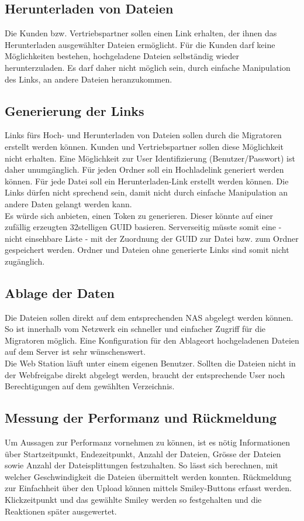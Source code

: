 \subsection{Herunterladen von Dateien}
Die Kunden bzw. Vertriebspartner sollen einen Link erhalten, der ihnen das Herunterladen ausgewählter Dateien ermöglicht.
Für die Kunden darf keine Möglichkeiten bestehen, hochgeladene Dateien selbständig wieder herunterzuladen. 
Es darf daher nicht möglich sein, durch einfache Manipulation des Links, an andere Dateien heranzukommen.

\subsection{Generierung der Links}\label{subsec:Links}
Links fürs Hoch-  und Herunterladen von Dateien sollen durch die Migratoren erstellt werden können. Kunden und Vertriebspartner sollen diese Möglichkeit nicht erhalten. 
Eine Möglichkeit zur User Identifizierung (Benutzer/Passwort) ist daher unumgänglich.
Für jeden Ordner soll ein Hochladelink generiert werden können. Für jede Datei soll ein Herunterladen-Link erstellt werden können. 
Die Links dürfen nicht sprechend sein, damit nicht durch einfache Manipulation an andere Daten gelangt werden kann. 
\\ 
Es würde sich anbieten, einen Token zu generieren. Dieser könnte auf einer zufällig erzeugten 32stelligen GUID basieren.
Serverseitig müsste somit eine - nicht einsehbare Liste - mit der Zuordnung der GUID zur Datei bzw. zum Ordner gespeichert werden.
Ordner und Dateien ohne generierte Links sind somit nicht zugänglich.

\subsection{Ablage der Daten}
Die Dateien sollen direkt auf dem entsprechenden NAS abgelegt werden können. So ist innerhalb vom Netzwerk ein schneller und einfacher Zugriff für die Migratoren möglich.
Eine Konfiguration für den Ablageort hochgeladenen Dateien auf dem Server ist sehr wünschenswert.
\\
Die Web Station läuft unter einem eigenen Benutzer. 
Sollten die Dateien nicht in der Webfreigabe direkt abgelegt werden, braucht der entsprechende User noch Berechtigungen auf dem gewählten Verzeichnis.

\clearpage
\subsection{Messung der Performanz und Rückmeldung}
Um Aussagen zur Performanz vornehmen zu können, ist es nötig Informationen über Startzeitpunkt, Endezeitpunkt, Anzahl der Dateien, Grösse der Dateien sowie Anzahl der Dateisplittungen festzuhalten.
So lässt sich berechnen, mit welcher Geschwindigkeit die Dateien übermittelt werden konnten.
Rückmeldung zur Einfachheit über den Upload können mittels Smiley-Buttons erfasst werden. Klickzeitpunkt und das gewählte Smiley werden so festgehalten und die Reaktionen später ausgewertet.


